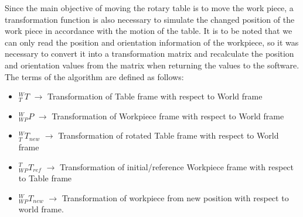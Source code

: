 Since the main objective of moving the rotary table is to move the work piece, a transformation function is also necessary to simulate the changed position of the work piece in accordance with the motion of the table. It is to be noted that we can only read the position and orientation information of the workpiece, so it was necessary to convert it into a transformation matrix and recalculate the position and orientation values from the matrix when returning the values to the software.
The terms of the algorithm are defined as follows:
\begin{itemize}
	\item $_{T}^{W}T$ $\rightarrow$ Transformation of Table frame with respect to World frame
	\item $_{WP}^{W}P$ $\rightarrow$ Transformation of Workpiece frame with respect to World frame
	\item $_{T}^{W}T_{new}$ $\rightarrow$ Transformation of rotated Table frame with respect to World frame
	\item $_{WP}^{T}T_{ref}$ $\rightarrow$ Transformation of initial/reference Workpiece frame with respect to Table frame
	\item $_{WP}^{W}T_{new}$ $\rightarrow$ Transformation of workpiece from new position with respect to world frame.
\end{itemize} 

